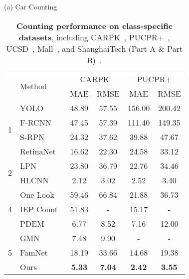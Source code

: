 \documentclass[10pt,twocolumn,letterpaper]{article}
\begin{document}
\begin{table}[t]
\caption{
    \textbf{Counting performance on class-specific datasets}, including CARPK~\cite{lpn}, PUCPR+~\cite{lpn}, UCSD~\cite{ucsd}, Mall~\cite{mall}, and ShanghaiTech (Part A \& Part B)~\cite{mcnn}. 
}
\vspace{5pt}
\begin{minipage}[t]{0.5\textwidth}
\centering
\scriptsize
\setlength\tabcolsep{8pt}
(a) Car Counting \\
\begin{threeparttable}
\begin{tabular}{clcccc}
\toprule
\multirow{2}{*}{} & \multirow{2}{*}{Method} & 
\multicolumn{2}{c}{CARPK} & \multicolumn{2}{c}{PUCPR+} \\
\cmidrule{3-6}
& & MAE & RMSE & MAE & RMSE \\
\midrule
\multirow{4}{*}{1} 
& YOLO~\cite{yolo}                 & 48.89 & 57.55 & 156.00 & 200.42 \\
& F-RCNN~\cite{faster_rcnn}        & 47.45 & 57.39 & 111.40 & 149.35 \\
& S-RPN~\cite{lpn}                 & 24.32 & 37.62 & 39.88 & 47.67 \\
& RetinaNet~\cite{retinanet}       & 16.62 & 22.30 & 24.58 & 33.12 \\
   \cmidrule{1-6}
\multirow{2}{*}{2}
& LPN~\cite{lpn}                   & 23.80 & 36.79 & 22.76 & 34.46 \\
& HLCNN~\cite{hlcnn}              & 2.12  & 3.02  & 2.52  & 3.40 \\
    \cmidrule{1-6}
\multirow{3}{*}{4}
& One Look~\cite{one_look}        & 59.46 & 66.84 & 21.88 & 36.73 \\
& IEP Count~\cite{iep_counting}   & 51.83 &   -   & 15.17 &   -   \\
& PDEM~\cite{pdem}                & 6.77  & 8.52  & 7.16  & 12.00 \\
   \cmidrule{1-6}
\multirow{3}{*}{5} 
& GMN~\cite{gmn}                   & 7.48  & 9.90  &   -   &   -   \\
& FamNet~\cite{famnet}             & 18.19 & 33.66 & 14.68\tnote{\dag} & 19.38\tnote{\dag} \\
    \cmidrule{2-6}
& Ours & \textbf{5.33}  & \textbf{7.04} & \textbf{2.42} & \textbf{3.55} \\
\bottomrule
\end{tabular}
\end{threeparttable}
\end{minipage}
\vfill
\vspace{5pt}

\end{table}
\end{document}
